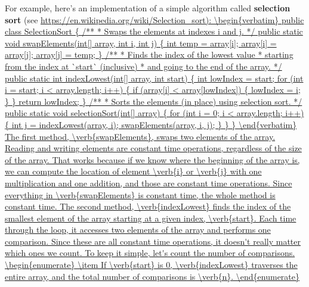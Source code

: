 \documentclass[12pt]{book}
\theoremstyle{exercise}
\newcommand{\java}{\verb}%}
\begin{document}
For example, here's an implementation of a simple algorithm called
{\bf selection sort}
(see \url{https://en.wikipedia.org/wiki/Selection_sort):

\begin{verbatim}
public class SelectionSort {

    /**
     * Swaps the elements at indexes i and j.
     */
    public static void swapElements(int[] array, int i, int j) {
        int temp = array[i];
        array[i] = array[j];
        array[j] = temp;
    }

    /**
     * Finds the index of the lowest value
     * starting from the index at `start` (inclusive)
     * and going to the end of the array.
     */
    public static int indexLowest(int[] array, int start) {
        int lowIndex = start;
        for (int i = start; i < array.length; i++) {
            if (array[i] < array[lowIndex]) {
                lowIndex = i;
            }
        }
        return lowIndex;
    }

    /**
     * Sorts the elements (in place) using selection sort.
     */
    public static void selectionSort(int[] array) {
        for (int i = 0; i < array.length; i++) {
            int j = indexLowest(array, i);
            swapElements(array, i, j);
        }
    }
}
\end{verbatim}

The first method, \java{swapElements}, swaps two elements of the
array. Reading and writing elements are constant time operations,
regardless of the size of the array. That works because if we know where
the beginning of the array is, we can compute the location of element
\java{i} or \java{j} with one multiplication and one addition, and
those are constant time operations. Since everything in
\java{swapElements} is constant time, the whole method is constant
time.

The second method, \java{indexLowest} finds the index of the smallest
element of the array starting at a given index, \java{start}. Each
time through the loop, it accesses two elements of the array and
performs one comparison. Since these are all constant time operations,
it doesn't really matter which ones we count. To keep it simple, let's
count the number of comparisons.

\begin{enumerate}

\item
  If \java{start} is 0, \java{indexLowest} traverses the entire
  array, and the total number of comparisons is \java{n}.


\end{enumerate}}
\end{document}
